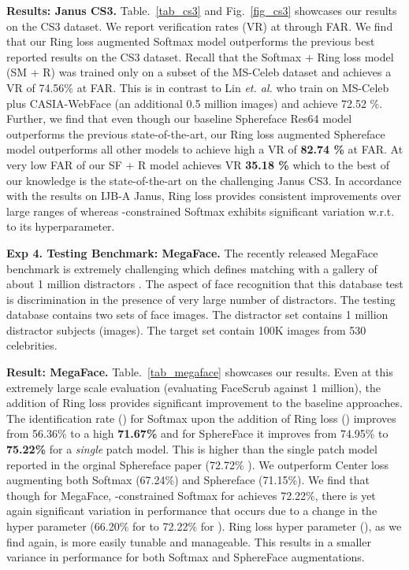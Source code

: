 \documentclass[10pt,twocolumn,letterpaper]{article}
\begin{document}
\textbf{Results: Janus CS3.} Table.~\ref{tab_cs3} and Fig.~\ref{fig_cs3} showcases our results on the CS3 dataset. We report verification rates (VR) at  through  FAR. We find that our Ring loss augmented Softmax model outperforms the previous best reported results on the CS3 dataset. Recall that the Softmax + Ring loss model (SM + R) was trained only on a subset of the MS-Celeb dataset and achieves a VR of 74.56\% at  FAR. This is in contrast to Lin \emph{et. al.} who train on MS-Celeb plus CASIA-WebFace (an additional 0.5 million images) and achieve 72.52 \%. Further, we find that even though our baseline Sphereface Res64 model outperforms the previous state-of-the-art, our Ring loss augmented Sphereface model outperforms all other models to achieve high a VR of \textbf{82.74 \%} at  FAR. At very low FAR of  our SF + R model achieves VR \textbf{35.18 \%} which to the best of our knowledge is the state-of-the-art on the challenging Janus CS3. In accordance with the results on IJB-A Janus, Ring loss provides consistent improvements over large ranges of  whereas -constrained Softmax exhibits significant variation w.r.t. to its hyperparameter.




\textbf{Exp 4. Testing Benchmark: MegaFace. } The recently released MegaFace benchmark is extremely challenging which defines matching with a gallery of about 1 million distractors \cite{kemelmacher2016megaface}. The aspect of face recognition that this database test is discrimination in the presence of very large number of distractors. The testing database contains two sets of face images. The distractor set contains 1 million distractor subjects (images). The target set contain 100K images from 530 celebrities.







\textbf{Result: MegaFace.}  Table.~\ref{tab_megaface} showcases our results. Even at this extremely large scale evaluation (evaluating FaceScrub against 1 million), the addition of Ring loss provides significant improvement to the baseline approaches. The identification rate () for Softmax upon the addition of Ring loss () improves from 56.36\% to a high \textbf{71.67\%} and for SphereFace it improves from 74.95\% to \textbf{75.22\%} for a \textit{single} patch model. This is higher than the single patch model reported in the orginal Sphereface paper (72.72\% \cite{liu2017sphereface}). We outperform Center loss  \cite{wen2016discriminative} augmenting both Softmax (67.24\%) and Sphereface (71.15\%). We find that though for MegaFace, -constrained Softmax \cite{ranjan2017l2} for   achieves 72.22\%, there is yet again significant variation in performance that occurs due to a change in the hyper parameter  (66.20\% for  to 72.22\% for ). Ring loss hyper parameter (), as we find again, is more easily tunable and manageable. This results in a smaller variance in performance for both Softmax and SphereFace augmentations.
\end{document}
